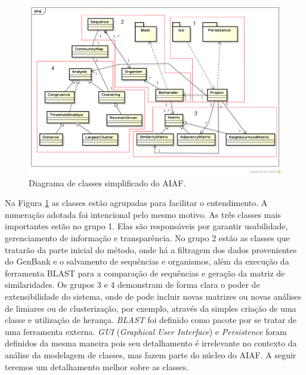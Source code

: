 \begin{figure}
\centering
\includegraphics[scale=0.52]{diagrama-classes-simplificado}
\caption{Diagrama de classes simplificado do AIAF.}
\label{fig:diagrama-classes-simplificado}
\end{figure}

Na Figura \ref{fig:diagrama-classes-simplificado} as classes estão agrupadas para facilitar o entendimento. A numeração adotada foi intencional pelo mesmo
motivo. As três classes mais importantes estão no grupo 1. Elas são responsáveis por garantir usabilidade, gerenciamento de informação e transparência. No
grupo 2 estão as classes que tratarão da parte inicial do método, onde há a filtragem dos dados provenientes do GenBank e o salvamento de sequências e
organismos, além da execução da ferramenta BLAST para a comparação de sequências e geração da matriz de similaridades. Os grupos 3 e 4 demonstram de forma
clara o poder de extensibilidade do sistema, onde de pode incluir novas matrizes ou novas análises de limiares ou de clusterização, por exemplo, através
da simples criação de uma classe e utilização de herança. \textit{BLAST} foi definido como pacote por se tratar de uma ferramenta externa.
\textit{GUI} (\textit{Graphical User Interface}) e \textit{Persistence}
foram definidos da mesma maneira pois seu detalhamento é irrelevante no contexto da análise da modelagem de classes, mas fazem parte do núcleo do AIAF.
A seguir teremos um detalhamento melhor sobre as classes.

